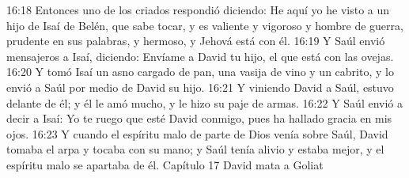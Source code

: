 16:18 Entonces uno de los criados respondió diciendo: He aquí yo he visto a un hijo de Isaí de Belén, que sabe tocar, y es valiente y vigoroso y hombre de guerra, prudente en sus palabras, y hermoso, y Jehová está con él.  
16:19 Y Saúl envió mensajeros a Isaí, diciendo: Envíame a David tu hijo, el que está con las ovejas.  
16:20 Y tomó Isaí un asno cargado de pan, una vasija de vino y un cabrito, y lo envió a Saúl por medio de David su hijo.  
16:21 Y viniendo David a Saúl, estuvo delante de él; y él le amó mucho, y le hizo su paje de armas.  
16:22 Y Saúl envió a decir a Isaí: Yo te ruego que esté David conmigo, pues ha hallado gracia en mis ojos.  
16:23 Y cuando el espíritu malo de parte de Dios venía sobre Saúl, David tomaba el arpa y tocaba con su mano; y Saúl tenía alivio y estaba mejor, y el espíritu malo se apartaba de él.  
Capítulo 17
David mata a Goliat  

